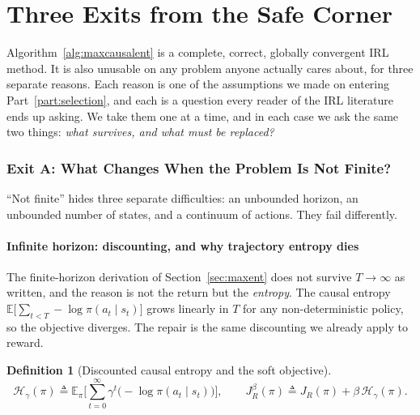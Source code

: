 \documentclass[11pt]{article}
\theoremstyle{plain}
\theoremstyle{definition}
\newtheorem{definition}[theorem]{Definition}
\theoremstyle{remark}
\newcommand{\E}{\mathbb{E}}
\begin{document}
\clearpage
\part{Three Exits from the Safe Corner}\label{part:exits}

Algorithm~\ref{alg:maxcausalent} is a complete, correct, globally
convergent IRL method. It is also unusable on any problem anyone actually
cares about, for three separate reasons. Each reason is one of the
assumptions we made on entering Part~\ref{part:selection}, and each is a
question every reader of the IRL literature ends up asking. We take them
one at a time, and in each case we ask the same two things: \emph{what
survives, and what must be replaced?}

\section{Exit A: What Changes When the Problem Is Not Finite?}
\label{sec:exita}

``Not finite'' hides three separate difficulties: an unbounded horizon, an
unbounded number of states, and a continuum of actions. They fail
differently.

\subsection{Infinite horizon: discounting, and why trajectory entropy dies}

The finite-horizon derivation of Section~\ref{sec:maxent} does not survive
$T\to\infty$ as written, and the reason is not the return but the
\emph{entropy}. The causal entropy $\E\big[\sum_{t<T}-\log\pi(a_t\mid
s_t)\big]$ grows linearly in $T$ for any non-deterministic policy, so the
objective diverges. The repair is the same discounting we already apply to
reward.

\begin{definition}[Discounted causal entropy and the soft objective]
\begin{equation}
\mathcal{H}_\gamma(\pi) \triangleq \E_\pi\Big[\sum_{t=0}^\infty \gamma^t
\big(-\log\pi(a_t\mid s_t)\big)\Big], \qquad
J_R^\beta(\pi) \triangleq J_R(\pi) + \beta\,\mathcal{H}_\gamma(\pi).
\label{eq:softobjective}
\end{equation}
\end{definition}
\end{document}
